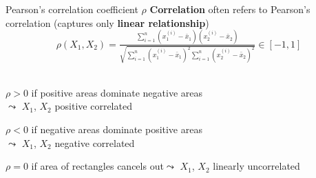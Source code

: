 \documentclass[10pt,compress,t,notes=noshow, xcolor=table]{beamer}
\begin{document}





\begin{frame}[t]{Pearson's correlation coefficient $\rho$}
\textbf{Correlation} often refers to Pearson's correlation (captures only \textbf{linear relationship})\\
$$\rho(X_1, X_2) = \tfrac{\sum_{i=1}^{n}(x_1^{(i)}-\bar{x}_1)(x_2^{(i)}-\bar{x}_2)}{\sqrt{\sum_{i=1}^{n}(x_1^{(i)}-\bar{x}_1)^2 \sum_{i=1}^{n}(x_2^{(i)}-\bar{x}_2)^2}} \in [-1, 1]$$
\spacer[0.125]
\\
\pause
\begin{itemizeM}
\item $\rho > 0$ if {\color{ggblue}positive areas} dominate {\color{ggred}negative areas}\\
$\leadsto$ $X_1$, $X_2$ positive correlated
\item $\rho < 0$ if {\color{ggred}negative areas} dominate {\color{ggblue}positive areas}\\
$\leadsto$ $X_1$, $X_2$ negative correlated
\item $\rho = 0$ if area of rectangles cancels out$\leadsto$ $X_1$, $X_2$ linearly uncorrelated
\end{itemizeM}
\end{frame}
\end{document}
